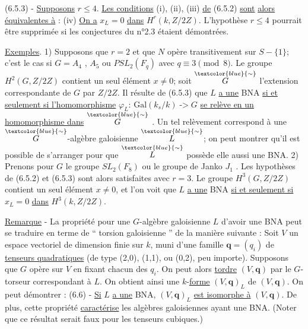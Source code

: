 \documentclass[11pt]{article}
\newcommand{\scanpage}[1]{\par\bigskip\noindent{\small\sffamily[scan #1]}\par}
\newcommand{\mspage}[1]{{\small\sffamily[p.\,#1]}}
\newcommand{\hand}[1]{\textcolor{blue}{#1}}
\newcommand{\uline}[1]{\underline{#1}}
\begin{document}
(6.5.3) - \uline{Supposons} $r \leq 4$. \uline{Les conditions} (i), (ii), (iii) \uline{de} (6.5.2) \uline{sont}
\uline{alors équivalentes à} :
(iv) \uline{On a} $x_{L} = 0$ \uline{dans} $H^{r}(k, Z/2Z)$.
L'hypothèse $r \leq 4$ pourrait être supprimée si les conjectures du n°2.3
étaient démontrées.

\uline{Exemples}. 1) Supposons que $r = 2$ et que $N$ opère transitivement sur
$S - \{1\}$; c'est le cas si $G = A_{4}$ , $A_{5}$ ou $PSL_{2}(F_{q})$ avec $q \equiv 3 \pmod{8}$.
Le groupe $H^{2}(G, Z/2Z)$ contient un seul élément $x \neq 0$; soit $\overset{\hand{\sim}}{G}$ l'extension
correspondante de $G$ par $Z/2Z$. Il résulte de (6.5.3) que $L$ \uline{a une} BNA
\uline{si et seulement si l'homomorphisme} $\varphi_{L}$: $\mathrm{Gal}(k_{s}/k) \;\text{->}\; G$ \uline{se relève en un}
\uline{homomorphisme dans} $\overset{\hand{\sim}}{G}$ . Un tel relèvement correspond à une $\overset{\hand{\sim}}{G}$-algèbre
galoisienne $\overset{\hand{\sim}}{L}$; on peut montrer qu'il est possible de s'arranger pour que
$\overset{\hand{\sim}}{L}$ possède elle aussi une BNA.
2) Prenons pour $G$ le groupe $SL_{2}(F_{8})$ ou le groupe de Janko $J_{1}$ . Les
hypothèses de (6.5.2) et (6.5.3) sont alors satisfaites avec $r = 3$.
Le groupe $H^{3}(G, Z/2Z)$ contient un seul élément $x \neq 0$, et l'on voit que
$L$ \uline{a une} BNA \uline{si et seulement si} $x_{L} = 0$ \uline{dans} $H^{3}(k, Z/2Z)$.

\uline{Remarque} - La propriété pour une $G$-algèbre galoisienne $L$ d'avoir une BNA
peut se traduire en terme de `` torsion galoisienne '' de la manière suivante :
Soit $V$ un espace vectoriel de dimension finie sur $k$, muni d'une famille
$\mathbf{q} = (q_{i})$ de \uline{tenseurs quadratiques} (de type (2,0), (1,1), ou (0,2), peu
importe). Supposons que $G$ opère sur $V$ en fixant chacun des $q_{i}$. On peut alors
\uline{tordre} $(V,\mathbf{q})$ par le $G$-torseur correspondant à $L$. On obtient ainsi une
$k$-\uline{forme} $(V,\mathbf{q})_{L}$ de $(V,\mathbf{q})$. On peut démontrer :
(6.6) - \uline{Si} $L$ \uline{a une} BNA, $(V,\mathbf{q})_{L}$ \uline{est isomorphe à} $(V,\mathbf{q})$.
De plus, cette propriété \uline{caractérise} les algèbres galoisiennes ayant une
BNA.
(Noter que ce résultat serait faux pour les tenseurs cubiques.)

\mspage{\hand{298}}

\clearpage
\scanpage{119/299}
\mspage{- 12 -}
\end{document}
